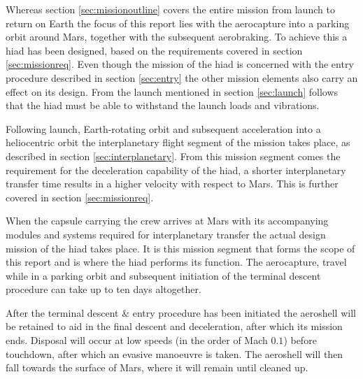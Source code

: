 Whereas section \ref{sec:missionoutline} covers the entire mission from launch to return on Earth the focus of this report lies with the aerocapture into a parking orbit around Mars, together with the subsequent aerobraking. To achieve this a \gls{hiad} has been designed, based on the requirements covered in section \ref{sec:missionreq}. Even though the mission of the \gls{hiad} is concerned with the entry procedure described in section \ref{sec:entry} the other mission elements also carry an effect on its design. From the launch mentioned in section \ref{sec:launch} follows that the \gls{hiad} must be able to withstand the launch loads and vibrations. 

Following launch, Earth-rotating orbit and subsequent acceleration into a heliocentric orbit the interplanetary flight segment of the mission takes place, as described in section \ref{sec:interplanetary}. From this mission segment comes the requirement for the deceleration capability of the \gls{hiad}, a shorter interplanetary transfer time results in a higher velocity with respect to Mars. This is further covered in section \ref{sec:missionreq}. 

When the capsule carrying the crew arrives at Mars with its accompanying modules and systems required for interplanetary transfer the actual design mission of the \gls{hiad} takes place. It is this mission segment that forms the scope of this report and is where the \gls{hiad} performs its function. The aerocapture, travel while in a parking orbit and subsequent initiation of the terminal descent procedure can take up to ten days altogether. 

After the terminal descent \& entry procedure has been initiated the aeroshell will be retained to aid in the final descent and deceleration, after which its mission ends. Disposal will occur at low speeds (in the order of Mach $0.1$) before touchdown, after which an evasive manoeuvre is taken. The aeroshell will then fall towards the surface of Mars, where it will remain until cleaned up.
